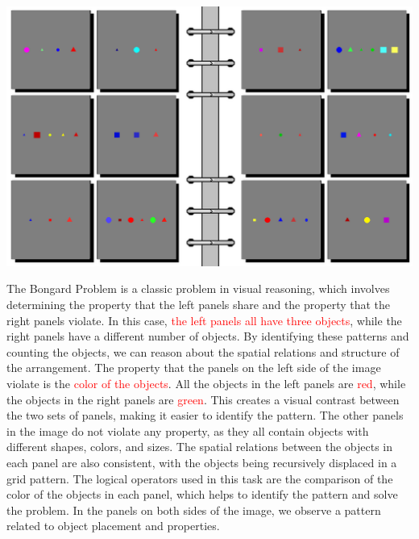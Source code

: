 \begin{tcolorbox}[breakable,enhanced jigsaw,opacityback=0,]
	\centering
	\includegraphics[width=.8\linewidth]{imgs/bongard/easy-12.png}\\
	\begin{dialogue}
		 The Bongard Problem is a classic problem in visual reasoning, which involves determining the property that the left panels share and the property that the right panels violate. In this case, \textcolor{red}{the left panels all have three objects}, while the right panels have a different number of objects. By identifying these patterns and counting the objects, we can reason about the spatial relations and structure of the arrangement.
		\vspace{1em}
		 The property that the panels on the left side of the image violate is the \textcolor{red}{color of the objects}. All the objects in the left panels are \textcolor{red}{red}, while the objects in the right panels are \textcolor{red}{green}. This creates a visual contrast between the two sets of panels, making it easier to identify the pattern. The other panels in the image do not violate any property, as they all contain objects with different shapes, colors, and sizes. The spatial relations between the objects in each panel are also consistent, with the objects being recursively displaced in a grid pattern. The logical operators used in this task are the comparison of the color of the objects in each panel, which helps to identify the pattern and solve the problem.
		\vspace{1em}
		 In the panels on both sides of the image, we observe a pattern related to object placement and properties.
		

\end{dialogue}
\end{tcolorbox}
